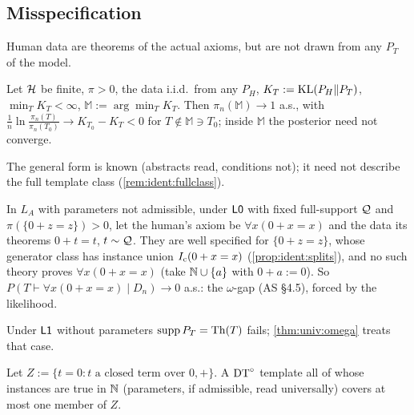 \subsection{Misspecification}\label{sec:ident:misspec}

Human data are theorems of the actual axioms, but are not drawn from any $P_T$ of the model.

\begin{theorem}\identbrk{}\label{thm:ident:kl}
Let $\mathcal{H}$ be finite, $\pi>0$, the data i.i.d.\ from any $P_H$, $K_T:=\mathrm{KL}(P_H\|P_T)$, $\min_TK_T<\infty$, $\mathbb M:=\arg\min_TK_T$. Then $\pi_n(\mathbb M)\to1$ a.s., with $\frac1n\ln\frac{\pi_n(T)}{\pi_n(T_0)}\to K_{T_0}-K_T<0$ for $T\notin\mathbb M\ni T_0$; inside $\mathbb M$ the posterior need not converge.
\end{theorem}

\noindent The general form is known \citep{berk1966limiting,kleijn2006misspecification} (abstracts read, conditions not); it need not describe the full template class (\cref{rem:ident:fullclass}).

\begin{example}\identbrk{}\label{ex:ident:weaker}
In $L_A$ with parameters not admissible, under $\mathord{\mathsf{L0}}$ with fixed full-support $\mathcal{Q}$ and $\pi(\{0+z=z\})>0$, let the human's axiom be $\forall x(0+x=x)$ and the data its theorems $0+t=t$, $t\sim\mathcal{Q}$. They are well specified for $\{0+z=z\}$, whose generator class has instance union $I_{\mathrm{c}}(0+x=x)$ (\cref{prop:ident:splits}), and no such theory proves $\forall x(0+x=x)$ (take $\mathbb{N}\cup\{a\}$ with $0+a:=0$). So $P(T\vdash\forall x(0+x=x)\mid D_n)\to0$ a.s.: the $\omega$-gap (AS \S4.5), forced by the likelihood.
\end{example}

\noindent Under $\mathord{\mathsf{L1}}$ without parameters $\operatorname{supp}P_T=\mathrm{Th}(T)$ fails; \cref{thm:univ:omega} treats that case.

\begin{lemma}\identbrk{}\label{lem:ident:zerosum}
Let $Z:=\{t=0:t\text{ a closed term over }0,+\}$. A $\mathrm{DT}^{\circ}$ template all of whose instances are true in $\mathbb{N}$ (parameters, if admissible, read universally) covers at most one member of $Z$.
\end{lemma}


